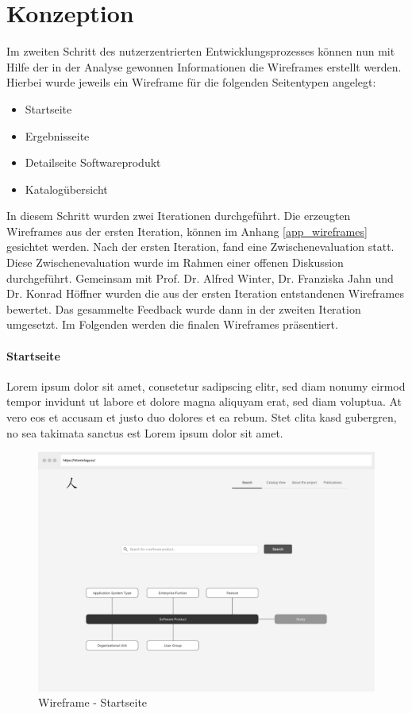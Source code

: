\section{Konzeption}

Im zweiten Schritt des nutzerzentrierten Entwicklungsprozesses können nun mit Hilfe der in der Analyse gewonnen Informationen die Wireframes erstellt werden.
Hierbei wurde jeweils ein Wireframe für die folgenden Seitentypen angelegt:

\begin{itemize}
\item Startseite
\item Ergebnisseite
\item Detailseite Softwareprodukt
\item Katalogübersicht
\end{itemize}

In diesem Schritt wurden zwei Iterationen durchgeführt.
Die erzeugten Wireframes aus der ersten Iteration, können im Anhang \ref{app_wireframes} gesichtet werden.
Nach der ersten Iteration, fand eine Zwischenevaluation statt.
Diese Zwischenevaluation wurde im Rahmen einer offenen Diskussion durchgeführt.
Gemeinsam mit Prof. Dr. Alfred Winter, Dr. Franziska Jahn und Dr. Konrad Höffner wurden die aus der ersten Iteration entstandenen Wireframes bewertet.
Das gesammelte Feedback wurde dann in der zweiten Iteration umgesetzt.
Im Folgenden werden die finalen Wireframes präsentiert.

\paragraph{Startseite}

Lorem ipsum dolor sit amet, consetetur sadipscing elitr, sed diam nonumy eirmod tempor invidunt ut labore et dolore magna aliquyam erat, sed diam voluptua. 
At vero eos et accusam et justo duo dolores et ea rebum. 
Stet clita kasd gubergren, no sea takimata sanctus est Lorem ipsum dolor sit amet.

\begin{figure}[H]
	\centering
    	\includegraphics[width=\textwidth]{Images/Wireframe_Startseite}
   	\caption{Wireframe - Startseite}
   	\label{fig:wireframe_start}
\end{figure}

